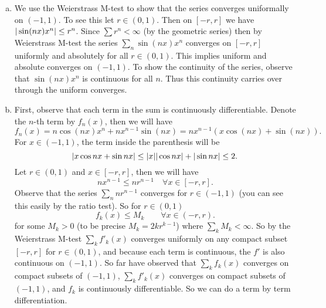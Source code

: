 \begin{solution}
	\begin{enumerate}[(a)]
		\item We use the Weierstrass M-test to show that the series converges uniformally on $ (-1,1) $. To see this let $ r \in (0,1) $. Then on $ [-r,r] $ we have $ |\sin(nx)x^n| \leq r^n $. Since $ \sum r^n < \infty $ (by the geometric series) then by Weierstrass M-test the series $ \sum_n \sin(nx)x^n $ converges on $ [-r,r] $ uniformly and absolutely for all $ r\in (0,1) $. This implies uniform and absolute converges on $ (-1,1) $. To show the continuity of the series, observe that $ \sin(nx)x^n $ is continuous for all $ n $. Thus this continuity carries over through the uniform converges. 
		
		\item First, observe that each term in the sum is continuously differentiable. Denote the $ n $-th term by $ f_n(x) $, then we will have
		\[ f_n(x) = n\cos(nx)x^n + nx^{n-1}\sin(nx) = nx^{n-1} (x\cos(nx) + \sin(nx)). \]
		For $ x \in (-1,1) $, the term inside the parenthesis will be
		\[ |x\cos nx + \sin nx| \leq |x||\cos nx| + |\sin nx| \leq 2. \]
		Let $ r \in (0,1) $ and $ x \in [-r,r] $, then we will have 
		\[ nx^{n-1} \leq nr^{n-1} \quad \forall x \in [-r,r]. \]
		Observe that the series $\sum_n nr^{n-1} $ converges for $ r\in (-1,1) $ (you can see this easily by the ratio test). So for $ r\in (0,1) $
		\[ f_k(x) \leq M_k  \qquad \forall x\in (-r,r). \]
		for some $ M_k > 0 $ (to be precise $ M_k = 2kr^{k-1} $) where $ \sum_k M_k < \infty $. So by the Weierstrass M-test $ \sum_k f'_k(x) $ converges uniformly on any compact subset $ [-r,r] $ for $ r\in (0,1) $, and because each term is continuous, the $ f' $ is also continuous on $ (-1,1) $. So far have observed that $ \sum_k f_k(x) $ converges on compact subsets of $ (-1,1) $, $ \sum_k f'_k(x) $ converges on compact subsets of $ (-1,1) $, and $ f_k $ is continuously differentiable. So we can do a term by term differentiation. 
	\end{enumerate}
\end{solution}

